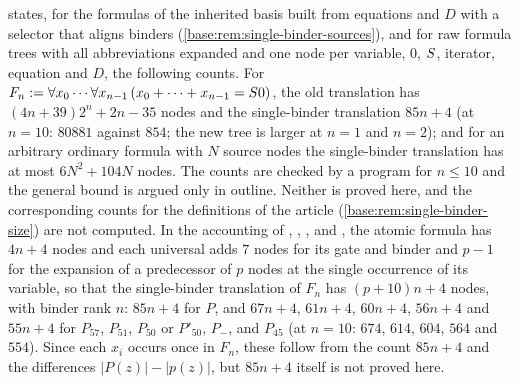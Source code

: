 \begin{question}
\label{base:q:single-binder-size}
 states, for the formulas of the inherited basis built
from equations and $D$ with a selector that aligns binders
(\cref{base:rem:single-binder-sources}), and for raw formula trees with all
abbreviations expanded and one node per variable, $0$, $S$, iterator,
equation and $D$, the following counts.  For
$F_n\mathrel{:=}\forall x_0\cdots\forall x_{n-1}\,(x_0+\dots+x_{n-1}=S 0)$, the
old translation has $(4n+39)2^n+2n-35$ nodes and the single-binder
translation $85n+4$ (at $n=10$: $80881$ against $854$; the new tree is
larger at $n=1$ and $n=2$); and for an arbitrary ordinary formula with $N$
source nodes the single-binder translation has at most $6N^2+104N$ nodes.
The counts are checked by a program for $n\le 10$ and the general bound is
argued only in outline.  Neither is proved here, and the corresponding
counts for the definitions of the article
(\cref{base:rem:single-binder-size}) are not computed.
In the accounting of , ,
,  and , the
atomic formula has $4n+4$ nodes and each universal adds $7$ nodes for its
gate and binder and $p-1$ for the expansion of a predecessor of $p$ nodes at
the single occurrence of its variable, so that the single-binder translation
of $F_n$ has $(p+10)n+4$ nodes, with binder rank $n$: $85n+4$ for $P$, and
$67n+4$, $61n+4$, $60n+4$, $56n+4$ and $55n+4$ for $P_{57}$, $P_{51}$,
$P_{50}$ or $P'_{50}$, $P_-$, and $P_{45}$ (at $n=10$: $674$, $614$, $604$,
$564$ and $554$).  Since each
$x_i$ occurs once in $F_n$, these follow from the count $85n+4$ and the
differences $|P(z)|-|p(z)|$, but $85n+4$ itself is not proved here.
\end{question}

